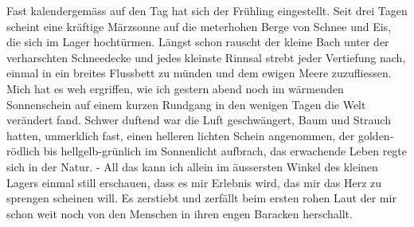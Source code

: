 \def\day{24. M\"{a}rz 1943}
\mktitle

Fast kalendergem\"{a}ss auf den Tag hat sich der Fr\"{u}hling eingestellt.
Seit drei Tagen scheint eine kr\"{a}ftige M\"{a}rzsonne auf die meterhohen Berge von Schnee und Eis, die sich im Lager hocht\"{u}rmen.
L\"{a}ngst schon rauscht der kleine Bach unter der verharschten Schneedecke und jedes kleinste Rinnsal strebt jeder Vertiefung nach, einmal in ein breites Flussbett zu m\"{u}nden und dem ewigen Meere zuzufliessen.
Mich hat es weh ergriffen, wie ich gestern abend noch im w\"{a}rmenden Sonnenschein auf einem kurzen Rundgang in den wenigen Tagen die Welt ver\"{a}ndert fand.
Schwer duftend war die Luft geschw\"{a}ngert, Baum und Strauch hatten, unmerklich fast, einen helleren lichten Schein angenommen, der golden-r\"{o}dlich bis hellgelb-gr\"{u}nlich im Sonnenlicht aufbrach, das erwachende Leben regte sich in der Natur.
- All das kann ich allein im \"{a}ussersten Winkel des kleinen Lagers einmal still erschauen, dass es mir Erlebnis wird, das mir das Herz zu sprengen scheinen will.
Es zerstiebt und zerf\"{a}llt beim ersten rohen Laut der mir schon weit noch von den Menschen in ihren engen Baracken herschallt.


\clearpage
